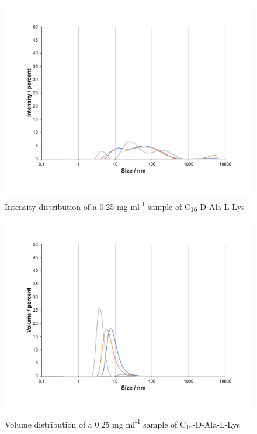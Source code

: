 \newpage
\begin{figure} [ht!]
\centering
 \includegraphics[scale=0.47]{DLS/KAT1_22_0_25mg_ml-1_size.pdf}
\caption{Intensity distribution of a 0.25 mg ml\textsuperscript{-1} sample of C\textsubscript{16}-D-Ala-L-Lys}
\label{intensity_distribution_KAT1.22_0.25}
\end{figure}
\begin{figure} [ht!]
\centering
\includegraphics[scale=0.47]{DLS/KAT1_22_0_25mg_ml-1_volume.pdf}
\caption{Volume distribution of a 0.25 mg ml\textsuperscript{-1} sample of C\textsubscript{16}-D-Ala-L-Lys}
\label{volume_distribution_KAT1.22_0.25}
\end{figure}
